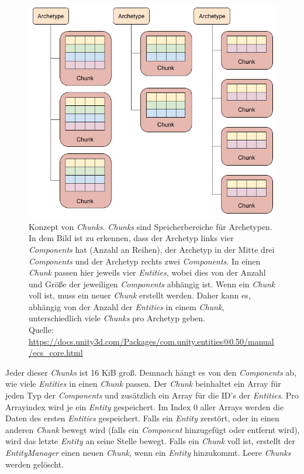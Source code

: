 \begin{figure}[H]
\begin{center}
\includegraphics[scale=0.45]{Bilder/ArchetypeChunkDiagram.png}
\caption[Konzept von \textit{Chunks}]{Konzept von \textit{Chunks}. \textit{Chunks} sind Speicherbereiche für Archetypen. In dem Bild ist zu erkennen, dass der Archetyp links vier \textit{Components} hat (Anzahl an Reihen), der Archetyp in der Mitte drei \textit{Components} und der Archetyp rechts zwei \textit{Components}. In einen \textit{Chunk} passen hier jeweils vier \textit{Entities}, wobei dies von der Anzahl und Größe der jeweiligen \textit{Components} abhängig ist. Wenn ein \textit{Chunk} voll ist, muss ein neuer \textit{Chunk} erstellt werden. Daher kann es, abhängig von der Anzahl der \textit{Entities} in einem \textit{Chunk}, unterschiedlich viele \textit{Chunks} pro Archetyp geben.\\
\footnotesize{Quelle: \url{https://docs.unity3d.com/Packages/com.unity.entities@0.50/manual/ecs_core.html}}}
\label{fig:archetyp_chunks}
\end{center}
\end{figure}
Jeder dieser \textit{Chunks} ist 16 KiB groß. Demnach hängt es von den \textit{Components} ab, wie viele \textit{Entities} in einen \textit{Chunk} passen. Der \textit{Chunk} beinhaltet ein Array für jeden Typ der \textit{Components} und zusätzlich ein Array für die ID's der \textit{Entities}. Pro Arrayindex wird je ein \textit{Entity} gespeichert. Im Index 0 aller Arrays werden die Daten des ersten \textit{Entities} gespeichert. Falls ein \textit{Entity} zerstört, oder in einen anderen \textit{Chunk} bewegt wird (falls ein \textit{Component} hinzugefügt oder entfernt wird), wird das letzte \textit{Entity} an seine Stelle bewegt. Falls ein \textit{Chunk} voll ist, erstellt der \textit{EntityManager} einen neuen \textit{Chunk}, wenn ein \textit{Entity} hinzukommt. Leere \textit{Chunks} werden gelöscht.

